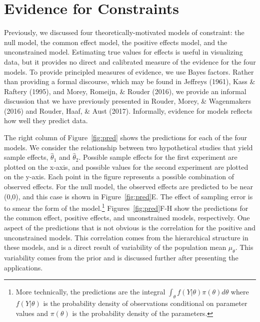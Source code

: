 \documentclass[english,man]{apa6}
\theoremstyle{definition}
\theoremstyle{definition}
\theoremstyle{remark}
\begin{document}
\section{Evidence for Constraints}\label{evidence-for-constraints}

Previously, we discussed four theoretically-motivated models of
constraint: the null model, the common effect model, the positive
effects model, and the unconstrained model. Estimating true values for
effects is useful in visualizing data, but it provides no direct and
calibrated measure of the evidence for the four models. To provide
principled measures of evidence, we use Bayes factors. Rather than
providing a formal discourse, which may be found in Jeffreys (1961),
Kass \& Raftery (1995), and Morey, Romeijn, \& Rouder (2016), we provide
an informal discussion that we have previously presented in Rouder,
Morey, \& Wagenmakers (2016) and Rouder, Haaf, \& Aust (2017).
Informally, evidence for models reflects how well they predict data.

The right column of Figure~\ref{fig:pred} shows the predictions for each
of the four models. We consider the relationship between two
hypothetical studies that yield sample effects, \(\hat{\theta}_1\) and
\(\hat{\theta}_2\). Possible sample effects for the first experiment are
plotted on the x-axis, and possible values for the second experiment are
plotted on the y-axis. Each point in the figure represents a possible
combination of observed effects. For the null model, the observed
effects are predicted to be near (0,0), and this case is shown in
Figure~\ref{fig:pred}E. The effect of sampling error is to smear the
form of the model.\footnote{More technically, the predictions are the
  integral \(\int_\theta f(Y|\theta)\pi(\theta)d\theta\) where
  \(f(Y|\theta)\) is the probability density of observations conditional
  on parameter values and \(\pi(\theta)\) is the probability density of
  the parameters.} Figures~\ref{fig:pred}F-H show the predictions for
the common effect, positive effects, and unconstrained models,
respectively. One aspect of the predictions that is not obvious is the
correlation for the positive and unconstrained models. This correlation
comes from the hierarchical structure in these models, and is a direct
result of variability of the population mean \(\mu_\theta\). This
variability comes from the prior and is discussed further after
presenting the applications.
\end{document}
